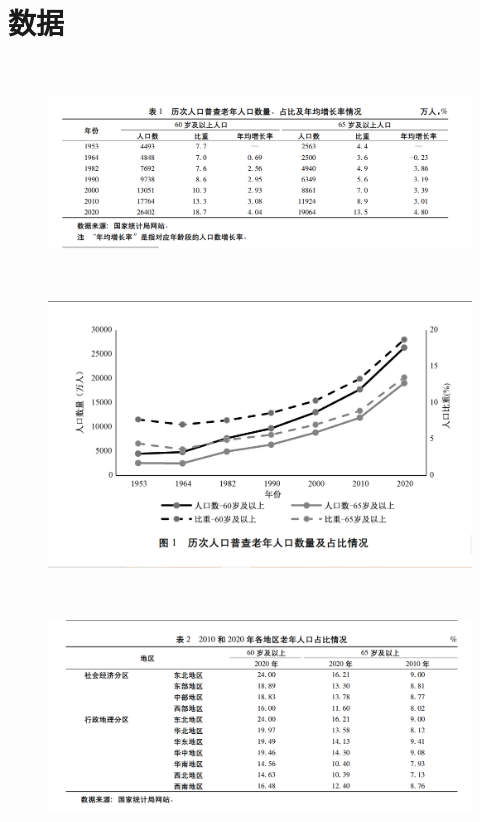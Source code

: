 \documentclass[presentation]{beamer}
\begin{document}
\section{数据}
\label{sec:org9131e73}
\begin{frame}[label={sec:org8d3178a}]{​}
\begin{figure}[htbp]
\centering
\includegraphics[width=.99\textwidth]{./5.png}
\label{}
\end{figure}
\end{frame}
\begin{frame}[label={sec:orgf2cd1e6}]{​}
\begin{figure}[htbp]
\centering
\includegraphics[width=.99\textwidth]{./6.png}
\label{}
\end{figure}
\end{frame}
\begin{frame}[label={sec:org5cd4f8c}]{​}
\begin{figure}[htbp]
\centering
\includegraphics[width=.99\textwidth]{./7.png}
\label{}
\end{figure}
\end{frame}
\end{document}

